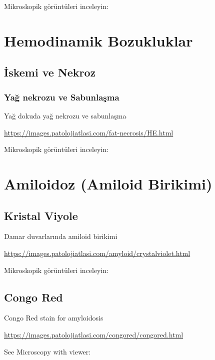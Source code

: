 \documentclass[
  letterpaper,
  DIV=11,
  numbers=noendperiod]{scrreprt}
\begin{document}
Mikroskopik görüntüleri inceleyin:

\hypertarget{hemodinamik-bozukluklar}{%
\chapter{Hemodinamik Bozukluklar}\label{hemodinamik-bozukluklar}}

\hypertarget{iskemi-ve-nekroz}{%
\section{İskemi ve Nekroz}\label{iskemi-ve-nekroz}}

\hypertarget{yaux11f-nekrozu-ve-sabunlaux15fma}{%
\subsection{Yağ nekrozu ve
Sabunlaşma}\label{yaux11f-nekrozu-ve-sabunlaux15fma}}

Yağ dokuda yağ nekrozu ve sabunlaşma

\url{https://images.patolojiatlasi.com/fat-necrosis/HE.html}

Mikroskopik görüntüleri inceleyin:

\hypertarget{amiloidoz-amiloid-birikimi}{%
\chapter{Amiloidoz (Amiloid
Birikimi)}\label{amiloidoz-amiloid-birikimi}}

\hypertarget{kristal-viyole}{%
\section{Kristal Viyole}\label{kristal-viyole}}

Damar duvarlarında amiloid birikimi

\url{https://images.patolojiatlasi.com/amyloid/crystalviolet.html}

Mikroskopik görüntüleri inceleyin:

\hypertarget{congo-red}{%
\section{Congo Red}\label{congo-red}}

Congo Red stain for amyloidosis

\url{https://images.patolojiatlasi.com/congored/congored.html}

See Microscopy with viewer:
\end{document}
